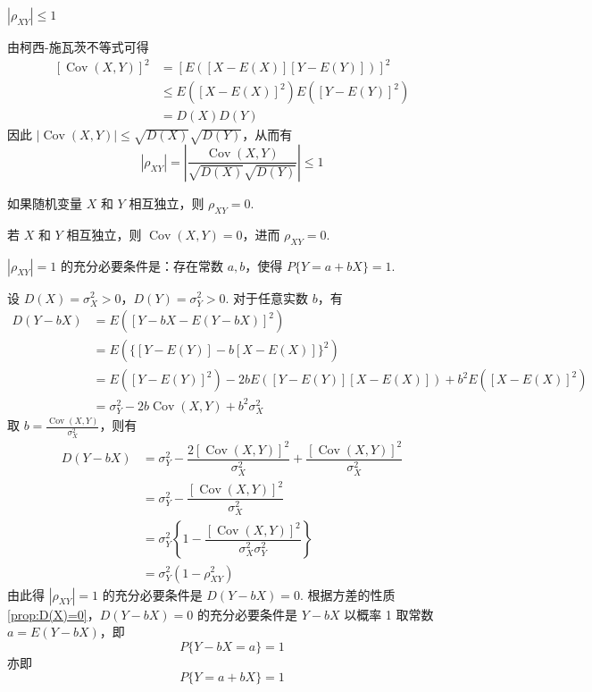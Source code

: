 \setcounter{propertyname}{0}

\begin{property}
    $|\rho_{XY}| \leqslant 1$
\end{property}

\begin{myproof}
    由柯西-施瓦茨不等式可得
    $$
    \begin{aligned}
        \left[ \operatorname{Cov}(X,Y) \right]^2 &= [E([X-E(X)][Y-E(Y)])]^2 \\
        & \leqslant E([X-E(X)]^2) E([Y-E(Y)]^2) \\
        &= D(X) D(Y)
    \end{aligned}
    $$
    因此 $|\operatorname{Cov}(X,Y)| \leqslant \sqrt{D(X)} \sqrt{D(Y)}$，从而有
    $$
    |\rho_{XY}| = \left| \dfrac{\operatorname{Cov}(X,Y)}{\sqrt{D(X)} \sqrt{D(Y)}} \right| \leqslant 1
    $$
\end{myproof}

\begin{property}
    如果随机变量 $X$ 和 $Y$ 相互独立，则 $\rho_{XY} = 0$.
\end{property}

\begin{myproof}
    若 $X$ 和 $Y$ 相互独立，则 $\operatorname{Cov}(X,Y) = 0$，进而 $\rho_{XY} = 0$.
\end{myproof}

\begin{property}
    $|\rho_{XY}|=1$ 的充分必要条件是：存在常数 $a,b$，使得 $P\{Y=a+bX\}=1$.
\end{property}

\begin{myproof}
    设 $D(X) = \sigma_X^2 > 0$，$D(Y) = \sigma_Y^2 > 0$. 对于任意实数 $b$，有
    $$
    \begin{aligned}
        D(Y-bX) &= E([Y-bX - E(Y-bX)]^2) \\
        &= E( \{[Y-E(Y)] - b[X-E(X)]\}^2 ) \\
        &= E([Y-E(Y)]^2) - 2bE([Y-E(Y)][X-E(X)]) + b^2 E([X-E(X)]^2) \\
        &= \sigma_Y^2 - 2b \operatorname{Cov}(X,Y) + b^2 \sigma_X^2
    \end{aligned}
    $$
    取 $b = \frac{\operatorname{Cov}(X,Y)}{\sigma_X^2}$，则有
    $$
    \begin{aligned}
        D(Y-bX) &= \sigma_Y^2 - \dfrac{2 [\operatorname{Cov}(X,Y)]^2}{\sigma_X^2} + \dfrac{[\operatorname{Cov}(X,Y)]^2}{\sigma_X^2} \\
        &= \sigma_Y^2 - \dfrac{[\operatorname{Cov}(X,Y)]^2}{\sigma_X^2} \\
        &= \sigma_Y^2 \left\{ 1 - \dfrac{[\operatorname{Cov}(X,Y)]^2}{\sigma_X^2 \sigma_Y^2} \right\} \\
        &= \sigma_Y^2 (1 - \rho_{XY}^2)
    \end{aligned}
    $$
    由此得 $|\rho_{XY}|=1$ 的充分必要条件是 $D(Y-bX)=0$. 根据方差的性质\ref*{prop:D(X)=0}，$D(Y-bX)=0$ 的充分必要条件是 $Y-bX$ 以概率 1 取常数 $a=E(Y-bX)$，即
    $$
    P \{ Y-bX=a \} = 1
    $$
    亦即
    $$
    P\{Y=a+bX\}=1
    $$
\end{myproof}

